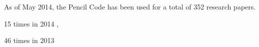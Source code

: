 \documentclass[12pt]{article}
\begin{document}
As of May 2014, the {\sc Pencil Code} has been used for a total of
352 research papers.
\begin{description}
\item
15 times in 2014 \citep{
2014A&A...564A...2L,%
2014MNRAS.441..116R,%
2014arXiv1404.3194M,%
2014arXiv1401.7306T,%
2014arXiv1401.6107J,%
2014ApJ...786...91B,%
2014ApJ...786...51C,%
2014arXiv1404.6964B,%
2014arXiv1404.6953G,%
2014arXiv1404.2238B,%
2014arXiv1403.1328P,%
2014arXiv1401.2981K,%
2014arXiv1402.2761M,%
2014ApJ...780L..22C,%
2014PhRvE..89c3009R%
},\item
\item
46 times in 2013 \citep{
2013Natur.499..184L,%
2013ApJ...777L..37W,%
2013arXiv1308.1660B,%
}
\end{description}
\end{document}
